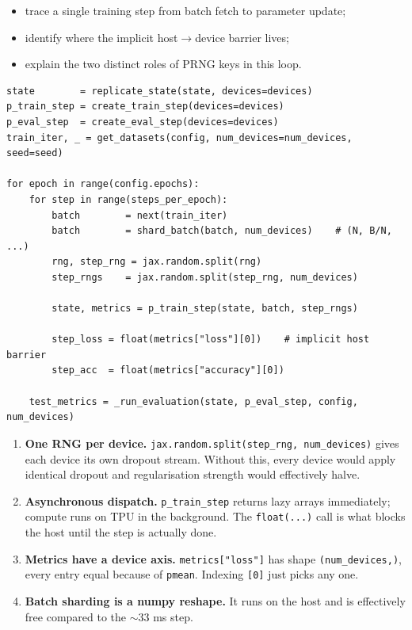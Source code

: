 \documentclass[11pt,a4paper]{article}
\begin{document}
\begin{objectives}
\begin{itemize}[leftmargin=*, itemsep=1pt]
    \item trace a single training step from batch fetch to parameter update;
    \item identify where the implicit host$\to$device barrier lives;
    \item explain the two distinct roles of PRNG keys in this loop.
\end{itemize}
\end{objectives}

\begin{lstlisting}[style=py]
state        = replicate_state(state, devices=devices)
p_train_step = create_train_step(devices=devices)
p_eval_step  = create_eval_step(devices=devices)
train_iter, _ = get_datasets(config, num_devices=num_devices, seed=seed)

for epoch in range(config.epochs):
    for step in range(steps_per_epoch):
        batch        = next(train_iter)
        batch        = shard_batch(batch, num_devices)    # (N, B/N, ...)
        rng, step_rng = jax.random.split(rng)
        step_rngs    = jax.random.split(step_rng, num_devices)

        state, metrics = p_train_step(state, batch, step_rngs)

        step_loss = float(metrics["loss"][0])    # implicit host barrier
        step_acc  = float(metrics["accuracy"][0])

    test_metrics = _run_evaluation(state, p_eval_step, config, num_devices)
\end{lstlisting}

\begin{keypoint}
\begin{enumerate}
\item \textbf{One RNG per device.} \texttt{jax.random.split(step\_rng, num\_devices)} gives
      each device its own dropout stream. Without this, every device would apply identical
      dropout and regularisation strength would effectively halve.
\item \textbf{Asynchronous dispatch.} \texttt{p\_train\_step} returns lazy arrays immediately;
      compute runs on TPU in the background. The \texttt{float(...)} call is what blocks the
      host until the step is actually done.
\item \textbf{Metrics have a device axis.} \texttt{metrics["loss"]} has shape
      \texttt{(num\_devices,)}, every entry equal because of \texttt{pmean}. Indexing
      \texttt{[0]} just picks any one.
\item \textbf{Batch sharding is a numpy reshape.} It runs on the host and is effectively
      free compared to the $\sim$33 ms step.
\end{enumerate}
\end{keypoint}
\end{document}
